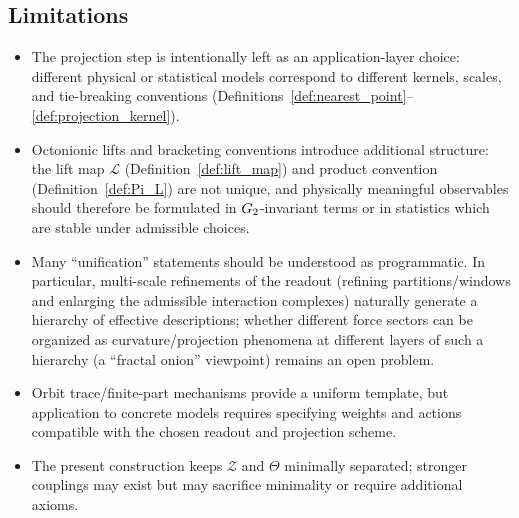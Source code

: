 \subsection{Limitations}
\begin{itemize}
    \item The projection step is intentionally left as an application-layer choice: different physical or statistical models correspond to different kernels, scales, and tie-breaking conventions (Definitions~\ref{def:nearest_point}--\ref{def:projection_kernel}).
    \item Octonionic lifts and bracketing conventions introduce additional structure: the lift map $\mathcal{L}$ (Definition~\ref{def:lift_map}) and product convention (Definition~\ref{def:Pi_L}) are not unique, and physically meaningful observables should therefore be formulated in $G_2$-invariant terms or in statistics which are stable under admissible choices.
    \item Many ``unification'' statements should be understood as programmatic. In particular, multi-scale refinements of the readout (refining partitions/windows and enlarging the admissible interaction complexes) naturally generate a hierarchy of effective descriptions; whether different force sectors can be organized as curvature/projection phenomena at different layers of such a hierarchy (a ``fractal onion'' viewpoint) remains an open problem.
    \item Orbit trace/finite-part mechanisms provide a uniform template, but application to concrete models requires specifying weights and actions compatible with the chosen readout and projection scheme.
    \item The present construction keeps $\mathcal{Z}$ and $\Theta$ minimally separated; stronger couplings may exist but may sacrifice minimality or require additional axioms.
\end{itemize}
